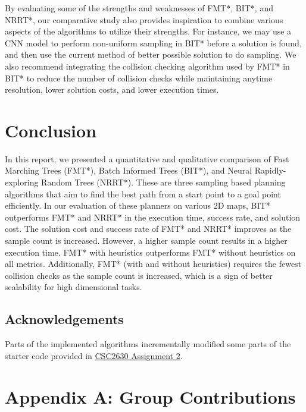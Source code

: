 \documentclass{article}
\begin{document}
By evaluating some of the strengths and weaknesses of FMT*, BIT*, and NRRT*, our comparative study also provides inspiration to combine various aspects of the algorithms to utilize their strengths. For instance, we may use a CNN model to perform non-uniform sampling in BIT* before a solution is found, and then use the current method of better possible solution to do sampling. We also recommend integrating the collision checking algorithm used by FMT* in BIT* to reduce the number of collision checks while maintaining anytime resolution, lower solution costs, and lower execution times.

\section{Conclusion}
In this report, we presented a quantitative and qualitative comparison of Fast Marching Trees (FMT*), Batch Informed Trees (BIT*), and Neural Rapidly-exploring Random Trees (NRRT*). These are three sampling based planning algorithms that aim to find the best path from a start point to a goal point efficiently. In our evaluation of these planners on various 2D maps, BIT* outperforms FMT* and NRRT* in the execution time, success rate, and solution cost. The solution cost and success rate of FMT* and NRRT* improves as the sample count is increased. However, a higher sample count results in a higher execution time. FMT* with heuristics outperforms FMT* without heuristics on all metrics. Additionally, FMT* (with and without heuristics) requires the fewest collision checks as the sample count is increased, which is a sign of better scalability for high dimensional tasks.

\subsection*{Acknowledgements}
Parts of the implemented algorithms incrementally modified some parts of the starter code provided in \href{https://github.com/florianshkurti/csc477_fall22/blob/master/path_planning_and_control_assignment/description/CSC477_Assignment_2.pdf}{CSC2630 Assignment 2}.

    
\clearpage



\clearpage

\section*{Appendix A: Group Contributions}
\label{sec:AppendixA}
    
\end{document}

